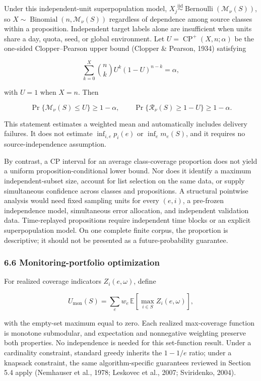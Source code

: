 \documentclass[
  11pt]{article}
\begin{document}
Under this independent-unit superpopulation model,
\(X_j\overset{\mathrm{iid}}{\sim}\operatorname{Bernoulli}(\mathcal M_\nu(S))\),
so \(X\sim\operatorname{Binomial}(n,\mathcal M_\nu(S))\) regardless of
dependence among source classes within a proposition. Independent target
labels alone are insufficient when units share a day, quota, seed, or
global environment. Let \(U=\operatorname{CP}^+(X,n;\alpha)\) be the
one-sided Clopper--Pearson upper bound (Clopper \& Pearson, 1934)
satisfying

\[\sum_{k=0}^{X}\binom nk U^k(1-U)^{n-k}=\alpha,\]

with \(U=1\) when \(X=n\). Then

\[\Pr\{\mathcal M_\nu(S)\le U\}\ge1-\alpha,\qquad
\Pr\{\mathcal R_\nu(S)\ge1-U\}\ge1-\alpha.\tag{9}\]

This statement estimates a weighted mean and automatically includes
delivery failures. It does not estimate \(\inf_{i,e}p_i(e)\) or
\(\inf_e m_e(S)\), and it requires no source-independence assumption.

By contrast, a CP interval for an average class-coverage proportion does
not yield a uniform proposition-conditional lower bound. Nor does it
identify a maximum independent-subset size, account for list selection
on the same data, or supply simultaneous confidence across classes and
propositions. A structural pointwise analysis would need fixed sampling
units for every \((e,i)\), a pre-frozen independence model, simultaneous
error allocation, and independent validation data. Time-replayed
propositions require independent time blocks or an explicit
superpopulation model. On one complete finite corpus, the proportion is
descriptive; it should not be presented as a future-probability
guarantee.

\subsubsection{6.6 Monitoring-portfolio
optimization}\label{monitoring-portfolio-optimization}

For realized coverage indicators \(Z_i(e,\omega)\), define

\[U_{\mathrm{mon}}(S)=\sum_e w_e\,\mathbb E\!\left[\max_{i\in S}Z_i(e,\omega)\right],\]

with the empty-set maximum equal to zero. Each realized max-coverage
function is monotone submodular, and expectation and nonnegative
weighting preserve both properties. No independence is needed for this
set-function result. Under a cardinality constraint, standard greedy
inherits the \(1-1/e\) ratio; under a knapsack constraint, the same
algorithm-specific guarantees reviewed in Section 5.4 apply (Nemhauser
et al., 1978; Leskovec et al., 2007; Sviridenko, 2004).
\end{document}
